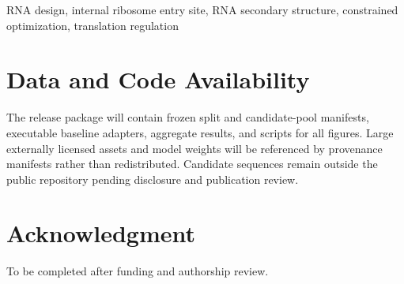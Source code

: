 \documentclass[conference]{IEEEtran}
\begin{document}
\begin{IEEEkeywords}
RNA design, internal ribosome entry site, RNA secondary structure, constrained
optimization, translation regulation
\end{IEEEkeywords}






\section*{Data and Code Availability}
The release package will contain frozen split and candidate-pool manifests,
executable baseline adapters, aggregate results, and scripts for all figures.
Large externally licensed assets and model weights will be referenced by
provenance manifests rather than redistributed. Candidate sequences remain
outside the public repository pending disclosure and publication review.


\section*{Acknowledgment}
To be completed after funding and authorship review.



\end{document}
